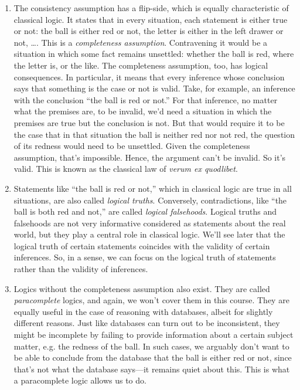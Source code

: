 \begin{enumerate}[\thesection.1]
	\item The consistency assumption has a flip-side, which is equally characteristic of classical logic. It states that in every situation, each statement is either true or not: the ball is either red or not, the letter is either in the left drawer or not, \dots. This is a \emph{completeness assumption}. Contravening it would be a situation in which some fact remains unsettled: whether the ball is red, where the letter is, or the like. The completeness assumption, too, has logical consequences. In particular, it means that every inference whose conclusion says that something is the case or not is valid. Take, for example, an inference with the conclusion ``the ball is red or not.'' For that inference, no matter what the premises are, to be invalid, we'd need a situation in which the premises are true but the conclusion is not. But that would require it to be the case that in that situation the ball is neither red nor not red, the question of its redness would need to be unsettled. Given the completeness assumption, that's impossible. Hence, the argument can't be invalid. So it's valid. This is known as the classical law of \emph{verum ex quodlibet}. 
	
	\item Statements like ``the ball is red or not,'' which in classical logic are true in all situations, are also called \emph{logical truths}. Conversely, contradictions, like ``the ball is both red and not,'' are called \emph{logical falsehoods}. Logical truths and falsehoods are not very informative considered as statements about the real world, but they play a central role in classical logic. We'll see later that the logical truth of certain statements coincides with the validity of certain inferences. So, in a sense, we can focus on the logical truth of statements rather than the validity of inferences. 
	
	\item Logics without the completeness assumption also exist. They are called \emph{paracomplete} logics, and again, we won't cover them in this course. They are equally useful in the case of reasoning with databases, albeit for slightly different reasons. Just like databases can turn out to be inconsistent, they might be incomplete by failing to provide information about a certain subject matter, e.g. the redness of the ball. In such cases, we arguably don't want to be able to conclude from the database that the ball is either red or not, since that's not what the database says---it remains quiet about this. This is what a paracomplete logic allows us to do.
	

\end{enumerate}
